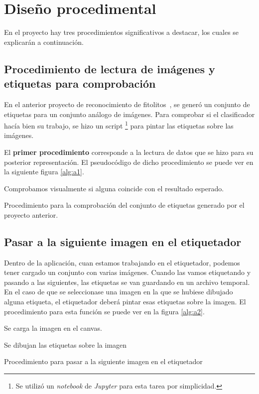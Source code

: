\section{Diseño procedimental}
En el proyecto hay tres procedimientos significativos a destacar, los cuales se explicarán a continuación.

\subsection{Procedimiento de lectura de imágenes y etiquetas para comprobación}

En el anterior proyecto de reconocimiento de fitolitos~\cite{jaime}, se generó un conjunto de etiquetas para un conjunto análogo de imágenes.
Para comprobar si el clasificador hacía bien su trabajo, se hizo un script \footnote{Se utilizó un \textit{notebook} de \textit{Jupyter} para esta tarea por simplicidad.} para pintar las etiquetas sobre las imágenes.

El \textbf{primer procedimiento} corresponde a la lectura de datos que se hizo para su posterior representación.
El pseudocódigo de dicho procedimiento se puede ver en la siguiente figura \ref{alg:a1}.

\begin{algorithm}
Comprobamos visualmente si alguna coincide con el resultado esperado.
	\caption{Procedimiento para la comprobación del conjunto de etiquetas generado por el proyecto anterior.}
	\label{alg:a1}
\end{algorithm}

\subsection{Pasar a la siguiente imagen en el etiquetador}
Dentro de la aplicación, cuan estamos trabajando en el etiquetador, podemos tener cargado un conjunto con varias imágenes.
Cuando las vamos etiquetando y pasando a las siguientes, las etiquetas se van guardando en un archivo temporal. En el caso de que se seleccionase una imagen en la que se hubiese dibujado alguna etiqueta, el etiquetador deberá pintar esas etiquetas sobre la imagen.
El procedimiento para esta función se puede ver en la figura \ref{alg:a2}.


\begin{algorithm}
	{
		Se carga la imagen en el canvas.
		
		{
			Se dibujan las etiquetas sobre la imagen
		}
		
	}
	\caption{Procedimiento para pasar a la siguiente imagen en el etiquetador}
	\label{alg:a2}
\end{algorithm}

